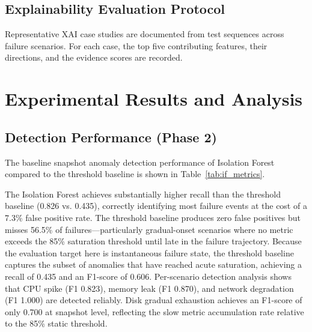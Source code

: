 \documentclass[conference]{IEEEtran}
\begin{document}
\subsection{Explainability Evaluation Protocol}

Representative XAI case studies are documented from test sequences across failure scenarios. For each case, the top five contributing features, their directions, and the evidence scores are recorded.

\section{Experimental Results and Analysis}

\subsection{Detection Performance (Phase 2)}
The baseline snapshot anomaly detection performance of Isolation Forest compared to the threshold baseline is shown in Table~\ref{tab:if_metrics}.

\begin{table}[htbp]
\centering
\caption{ANOMALY DETECTION: ISOLATION FOREST VS. THRESHOLD BASELINE}
\label{tab:if_metrics}
\end{table}

The Isolation Forest achieves substantially higher recall than the threshold baseline (0.826 vs. 0.435), correctly identifying most failure events at the cost of a 7.3\% false positive rate. The threshold baseline produces zero false positives but misses 56.5\% of failures---particularly gradual-onset scenarios where no metric exceeds the 85\% saturation threshold until late in the failure trajectory. Because the evaluation target here is instantaneous failure state, the threshold baseline captures the subset of anomalies that have reached acute saturation, achieving a recall of 0.435 and an F1-score of 0.606. Per-scenario detection analysis shows that CPU spike (F1 0.823), memory leak (F1 0.870), and network degradation (F1 1.000) are detected reliably. Disk gradual exhaustion achieves an F1-score of only 0.700 at snapshot level, reflecting the slow metric accumulation rate relative to the 85\% static threshold.
\end{document}
